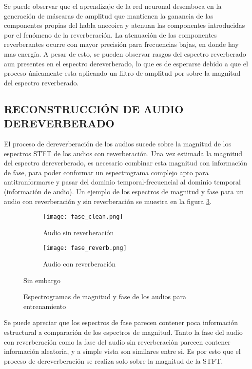 Se puede observar que el aprendizaje de la red neuronal desemboca en la generación de máscaras de amplitud que mantienen la ganancia de las componentes propias del habla anecoica y atenuan las componentes introducidas por el fenómeno de la reverberación. La atenuación de las componentes reverberantes ocurre con mayor precisión para frecuencias bajas, en donde hay mas energía. A pesar de esto, se pueden observar rasgos del espectro reverberado aun presentes en el espectro dereverberado, lo que es de esperarse debido a que el proceso únicamente esta aplicando un filtro de amplitud por sobre la magnitud del espectro reverberado.



\subsection[Reconstrucción de audio dereverberado]{RECONSTRUCCIÓN DE AUDIO DEREVERBERADO}
El proceso de dereverberación de los audios sucede sobre la magnitud de los espectros STFT de los audios con reverberación. Una vez estimada la magnitud del espectro dereverberado, es necesario combinar esta magnitud con información de fase, para poder conformar un espectrograma complejo apto para antitranformarse y pasar del dominio temporal-frecuencial al dominio temporal (información de audio). Un ejemplo de los espectros de magnitud y fase para un audio con reverberación y sin reverberación se muestra en la figura \ref{fig:fases}.

\begin{figure}[H]
\centering
\begin{subfigure}{.5\textwidth}
  \centering
  \texttt{[image: fase\_clean.png]}
  \caption{Audio sin reverberación}
  \label{fig:fase_sub1}
\end{subfigure}%
\begin{subfigure}{.5\textwidth}
  \centering
  \texttt{[image: fase\_reverb.png]}
  \caption{Audio con reverberación}
  \label{fig:fase_sub2}
\end{subfigure}Sin embargo
\caption{Espectrogramas de magnitud y fase de los audios para entrenamiento}
\label{fig:fases}
\end{figure} 

Se puede apreciar que los espectros de fase parecen contener poca información estructural a comparación de los espectros de magnitud. Tanto la fase del audio con reverberación como la fase del audio sin reverberación parecen contener información aleatoria, y a simple vista son similares entre si. Es por esto que el proceso de dereverberación se realiza solo sobre la magnitud de la STFT. 


